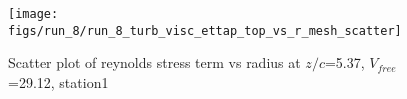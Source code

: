 \begin{figure}[H]
\centering
\texttt{[image: figs/run\_8/run\_8\_turb\_visc\_ettap\_top\_vs\_r\_mesh\_scatter]}
\caption{Scatter plot of reynolds stress term vs radius at $z/c$=5.37, $V_{free}$=29.12, station1}
\label{fig:run_8_turb_visc_ettap_top_vs_r_mesh_scatter}
\end{figure}


